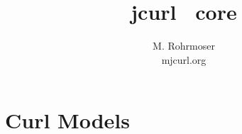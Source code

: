 \documentclass[a4paper,11pt,twoside]{report}
\title{jcurl \rock\ core}
\author{M. Rohrmoser\\{\small m\symbol{64}jcurl.org}}
\begin{document}
\maketitle \tableofcontents


\chapter{Curl Models}



\begin{appendix}
\end{appendix}



\end{document}
